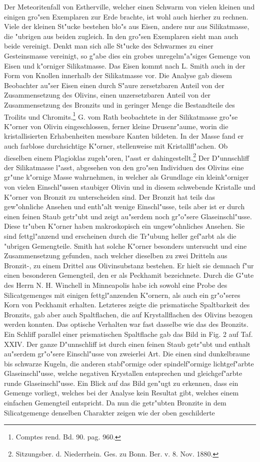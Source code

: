 \documentclass[a4paper, 11pt, oneside, polutonikogreek, german]{article}
\begin{document}
Der Meteoritenfall von Estherville, welcher einen Schwarm von vielen kleinen und einigen gro"sen Exemplaren zur Erde brachte, ist wohl auch hierher zu rechnen. Viele der kleinen St"ucke bestehen blo"s aus Eisen, andere nur aus Silikatmasse, die "ubrigen aus beiden zugleich. In den gro"sen Exemplaren sieht man auch beide vereinigt. Denkt man sich alle St"ucke des Schwarmes zu einer Gesteinsmasse vereinigt, so g"abe dies ein grobes unregelm"a"siges Gemenge von Eisen und k"orniger Silikatmasse. Das Eisen kommt nach L. Smith auch in der Form von Knollen innerhalb der Silikatmasse vor. Die Analyse gab diesem Beobachter au"ser Eisen einen durch S"aure zersetzbaren Anteil von der Zusammensetzung des Olivins, einen unzersetzbaren Anteil von der Zusammensetzung des Bronzits und in geringer Menge die Bestandteile des Troilits und Chromits.\footnote{Comptes rend. Bd. 90. pag. 960.} G. vom Rath beobachtete in der Silikatmasse gro"se K"orner von Olivin eingeschlossen, ferner kleine Drusenr"aume, worin die kristallisierten Erhabenheiten messbare Kanten bildeten. In der Masse fand er auch farblose durchsichtige K"orner, stellenweise mit Kristallfl"achen. Ob dieselben einem Plagioklas zugeh"oren, l"asst er dahingestellt.\footnote{Sitzungsber. d. Niederrhein. Ges. zu Bonn. Ber. v. 8. Nov. 1880.} Der D"unnschliff der Silikatmasse l"asst, abgesehen von den gro"sen Individuen des Olivins eine gr"une k"ornige Masse wahrnehmen, in welcher als Grundlage ein kleink"orniger von vielen Einschl"ussen staubiger Olivin und in diesem schwebende Kristalle und K"orner von Bronzit zu unterscheiden sind. Der Bronzit hat teils das gew"ohnliche Ansehen und enth"alt wenige Einschl"usse, teils aber ist er durch einen feinen Staub getr"ubt und zeigt au"serdem noch gr"o"sere Glaseinschl"usse. Diese tr"uben K"orner haben makroskopisch ein ungew"ohnliches Ansehen. Sie sind fettgl"anzend und erscheinen durch die Tr"ubung heller gef"arbt als die "ubrigen Gemengteile. Smith hat solche K"orner besonders untersucht und eine Zusammensetzung gefunden, nach welcher dieselben zu zwei Dritteln aus Bronzit-, zu einem Drittel aus Olivinsubstanz bestehen. Er hielt sie demnach f"ur einen besonderen Gemengteil, den er als Peckhamit bezeichnete. Durch die G"ute des Herrn N. H. Winchell in Minneapolis habe ich sowohl eine Probe des Silicatgemenges mit einigen fettgl"anzenden K"ornern, als auch ein gr"o"seres Korn von Peckhamit erhalten. Letzteres zeigte die prismatische Spaltbarkeit des Bronzits, gab aber auch Spaltflachen, die auf Krystallflachen des Olivins bezogen werden konnten. Das optische Verhalten war fast dasselbe wie das des Bronzits. Ein Schliff parallel einer prismatischen Spaltflache gab das Bild in Fig. 2 auf Taf. XXIV. Der ganze D"unnschliff ist durch einen feinen Staub getr"ubt und enthalt au"serdem gr"o"sere Einschl"usse von zweierlei Art. Die einen sind dunkelbraune bis schwarze Kugeln, die anderen stabf"ormige oder spindelf"ormige lichtgef"arbte Glaseinschl"usse, welche negativen Krystallen entsprechen und gleichgef"arbte runde Glaseinschl"usse. Ein Blick auf das Bild gen"ugt zu erkennen, dass ein Gemenge vorliegt, welches bei der Analyse kein Resultat gibt, welches einem einfachen Gemengteil entspricht. Da nun die getr"ubten Bronzite in dem Silicatgemenge denselben Charakter zeigen wie der oben geschilderte 
\end{document}
